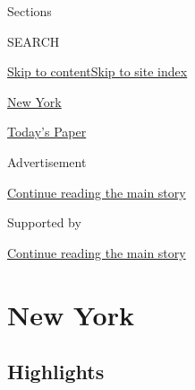 Sections

SEARCH

\protect\hyperlink{site-content}{Skip to
content}\protect\hyperlink{site-index}{Skip to site index}

\href{https://www.nytimes.com/section/nyregion}{New York}

\href{https://myaccount.nytimes.com/auth/login?response_type=cookie\&client_id=vi}{}

\href{https://www.nytimes.com/section/todayspaper}{Today's Paper}

Advertisement

\protect\hyperlink{after-top}{Continue reading the main story}

Supported by

\protect\hyperlink{after-sponsor}{Continue reading the main story}

\hypertarget{new-york}{%
\section{New York}\label{new-york}}

\hypertarget{highlights}{%
\subsection{Highlights}\label{highlights}}

